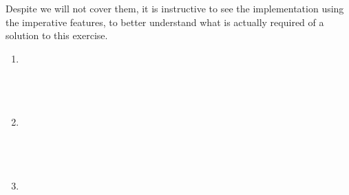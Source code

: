 \documentclass{article}
\newenvironment{enumeratealpha}{\begin{enumerate}[a{\textup{)}}] }{\end{enumerate}}
{\theorembodyfont{\rmfamily\small}\newtheorem{exercise}{Exercise}}
\begin{document}
Despite we will not cover them, it is instructive to see the implementation
using the imperative features, to better understand what is actually required
of a solution to this exercise.
\begin{enumeratealpha}
  \item {}{}{\hlopt{=}}{\hlendline{}}\\
  {\hlstd{ \ }}{}{}{\hlopt{= }}{}{}{}{\hlendline{}}\\
  {\hlstd{ \ }}{}{}{\hlopt{=
  }}{}{}{}{}{\hlendline{}}\\
  {}{\hlopt{:= }}{}{\hlopt{!}}{}{}{\hlopt{;}}{\hlendline{}}\\
  {\hlstd{ \ }}{\hlopt{!}}{}
  
  \item {}{}{\hlopt{=}}{\hlendline{}}\\
  {\hlstd{ \ }}{}{}{\hlopt{= }}{}{}{}{\hlendline{}}\\
  {\hlstd{ \ }}{}{}{\hlopt{=
  }}{}{}{}{}{\hlendline{}}\\
  {}{\hlopt{:= }}{}{\hlopt{!}}{}{}{\hlopt{;}}{\hlendline{}}\\
  {\hlstd{ \ }}{\hlopt{!}}{}
  
  \item {}{}{\hlopt{=}}{\hlendline{}}\\
  {\hlstd{ \ }}{}{}{\hlopt{= }}{}{}{}{\hlendline{}}\\
  {\hlstd{ \ }}{}{}{\hlopt{!}}{}{}{\hlendline{}}\\
  {}{\hlopt{:= }}{}{\hlopt{!}}{}{}{\hlopt{;}}{\hlendline{}}\\
  {\hlstd{ \ }}{\hlopt{!}}{}
  

\end{enumeratealpha}
\end{document}

